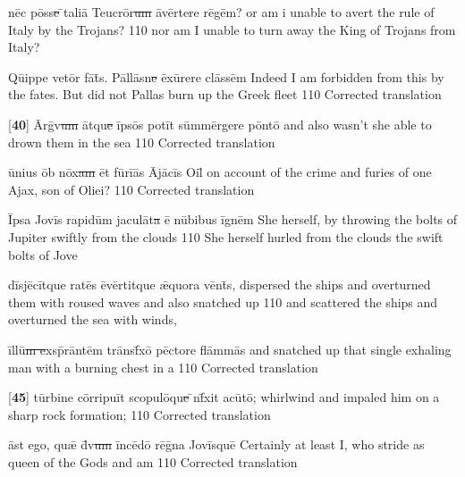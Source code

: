 \latline
  {n\=ec p\=oss\sout{e }\={}t\-al\-i\={\macron a} T\-e\-ucr\={\macron o}r\sout{um }\={\macron a}v\=ert\-er\-e r\={\macron e}g\=em?}
  {or am i unable to avert the rule of Italy by the Trojans? }
  {110} %
  {nor am I unable to turn away the King of Trojans from Italy?}
  {
  }

\latline
  {Q\={ui}pp\-e v\-et\=or f\={\macron a}t\={\macron{\i}}s.  P\=all\=asn\sout{e }\=ex\={\macron u}r\-er\-e cl\=ass\=em}
  {Indeed I am forbidden from this by the fates.  But did not Pallas burn up the Greek fleet }
  {110} %
  {Corrected translation}
  {
  }



\latline
  {[\textbf{40}] \=Arg\={\macron{\i}}v\sout{um }\=atqu\sout{e }\=ips\={\macron o}s p\-ot\=it s\=umm\=erg\-er\-e p\=ont\={\macron o}}
  {and also wasn't she able to drown them in the sea}
  {110} %
  {Corrected translation}
  {
  }

\latline
  {\={\macron u}n\-i\-us \=ob n\=ox\sout{am }\=et f\=ur\=i\={\macron a}s \=Aj\={\macron a}c\=is \-O\-il\={\macron{\i}}}
  {on account of the crime and furies of one Ajax, son of Oliei?}
  {110} %
  {Corrected translation}
  {
  }

\latline
  {\=Ips\-a J\-ov\=is r\-ap\-id\=um j\-ac\-ul\={\macron a}t\sout{a }\={\macron e} n\={\macron u}b\-ib\-us \=ign\=em}
  {She herself, by throwing the bolts of Jupiter swiftly from the clouds}
  {110} %
  {She herself hurled from the clouds the swift bolts of Jove}
  {
  }

\latline
  {d\=isj\={\macron e}c\=itqu\-e r\-at\={\macron e}s \={\macron e}v\=ert\-itqu\-e \={\ae}qu\-or\-a v\=ent\={\macron{\i}}s,}
  {dispersed the ships and overturned them with roused waves and also snatched up }
  {110} %
  {and scattered the ships and overturned the sea with winds,}
  {
  }

\latline
  {\=ill\=u\sout{m e}xsp\={\macron{\i}}r\=ant\=em tr\={\macron a}nsf\={\macron{\i}}x\={\macron o} p\=ect\-or\-e fl\=amm\={\macron a}s}
  {and snatched up that single exhaling man with a burning chest in a}
  {110} %
  {Corrected translation}
  {
  }

\latline
  {[\textbf{45}] t\=urb\-in\-e c\=orr\-ip\-u\=it sc\-op\-ul\={\macron o}qu\sout{e }\={\macron{\i}}nf\={\macron{\i}}x\-it \-ac\={\macron u}t\={\macron o};}
  {whirlwind  and impaled him on a sharp rock formation;}
  {110} %
  {Corrected translation}
  {
  }

\latline
  {\=ast \-eg\-o, qu\={\ae} d\={\macron{\i}}v\sout{um }\=inc\={\macron e}d\={\macron o} r\={\macron e}g\={\macron{\i}}n\-a J\-ov\=isqu\=e}
  {Certainly at least I, who stride as queen of the Gods and am }
  {110} %
  {Corrected translation}
  {
  }


